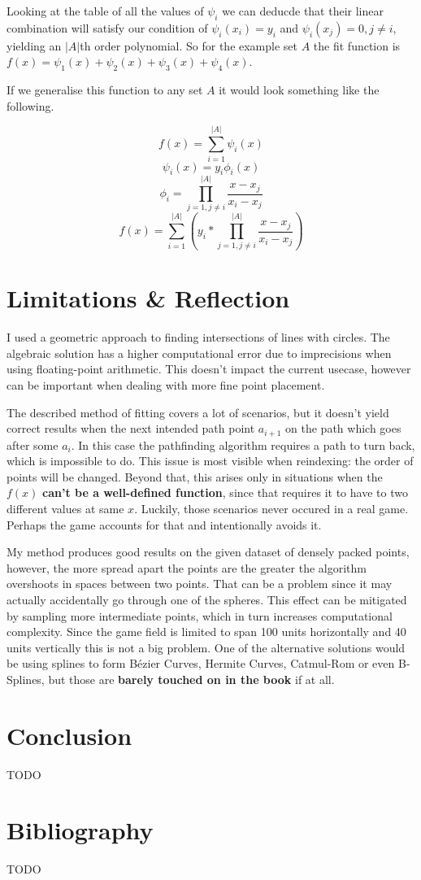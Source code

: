 \documentclass[12pt, titlepage]{article}
\newcommand{\TODO}{\begin{center}\color{red}TODO\end{center}}
\begin{document}
Looking at the table of all the values of $\psi_i$ we can deducde that their linear
combination will satisfy our condition of $\psi_i(x_i) = y_i$ and 
$\psi_i(x_j) = 0, j \neq i$, yielding an $|A|$th order polynomial. 
So for the example set $A$ the fit function is 
$f(x) = \psi_1(x) + \psi_2(x) + \psi_3(x) + \psi_4(x)$.

If we generalise this function to any set $A$ it would look something 
like the following.

$$f(x) = \sum_{i=1}^{|A|}\psi_i(x)$$
$$\psi_i(x) = y_i \phi_i(x)$$
\begin{equation}
    \phi_i = \prod_{j=1, j \neq i}^{|A|}\frac{x - x_j}{x_i - x_j}
\end{equation}
\begin{equation}
f(x) = \sum_{i=1}^{|A|} \left(y_i * \prod_{j=1, j \neq i}^{|A|} \frac{x - x_j}{x_i - x_j}\right)
\end{equation}

\section{Limitations \& Reflection}
I used a geometric approach to finding intersections of lines with circles.
The algebraic solution has a higher computational error due to imprecisions 
when using floating-point arithmetic. This doesn't impact the current usecase,
however can be important when dealing with more fine point placement.

The described method of fitting covers a lot of scenarios, but it doesn't yield 
correct results
when the next intended path point $a_{i + 1}$ on the path which goes after 
some $a_i$. In this case the pathfinding algorithm requires a path to turn back,
which is impossible to do. This issue is most visible when reindexing: the order
of points will be changed. Beyond that, this arises only in situations when the 
$f(x)$ \textbf{can't be a well-defined function}, since that requires it to have to
two different values at same $x$. Luckily, those scenarios never occured in a 
real game. Perhaps the game accounts for that and intentionally avoids it.

My method produces good results on the given dataset of densely packed points,
however, the more spread apart the points are the greater the algorithm
overshoots in spaces between two points. That can be a problem since it may 
actually accidentally go through one of the spheres. This effect can be
mitigated by sampling more intermediate points, which in turn increases 
computational complexity. Since the game field is  limited to span 100 units
horizontally and 40 units vertically this is not a big problem. One of the
alternative solutions would be using splines to form B\'{e}zier Curves, 
Hermite Curves, Catmul-Rom or even B-Splines, but those are \textbf{barely touched 
on in the book} if at all.

\section{Conclusion}
\TODO

\section{Bibliography}
\appendix
\TODO
\end{document}
